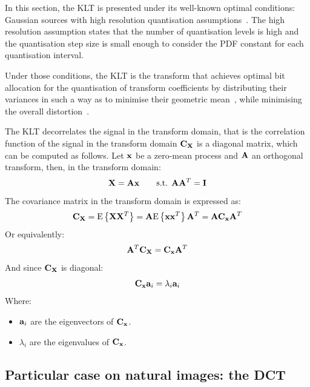 \documentclass[11pt,a4paper,openright,twoside]{book}
\numberwithin{equation}{section} %
\numberwithin{figure}{section} %
\numberwithin{table}{section} %
\begin{document}
In this section, the \ac{KLT} is presented under its well-known optimal
conditions: Gaussian sources with high resolution quantisation
assumptions~\cite{goyal-00-high-resolution}.
The high resolution assumption states that the number of quantisation levels
is high and the quantisation step size is small enough to consider the
\ac{PDF} constant for each quantisation interval.

Under those conditions, the \ac{KLT} is the transform that achieves optimal
bit allocation for the quantisation of transform coefficients by distributing
their variances in such a way as to minimise their geometric
mean~\cite{jayant-84-digital-coding-waveforms}, while minimising the overall
distortion~\cite{gersho-92-vector-quantization}.

The \ac{KLT} decorrelates the signal in the transform domain, that is the
correlation function of the signal in the transform domain $\mathbf{C}_{\mathbf{X}}$ is a
diagonal matrix, which can be computed as follows.
Let $\mathbf{x}$ be a zero-mean process and $\mathbf{A}$ an orthogonal transform, then, in
the transform domain:
\begin{equation}
	\mathbf{X} = \mathbf{A} \mathbf{x} \qquad \text{s.t. } \mathbf{A} \mathbf{A}^T = \mathbf{I}
\end{equation}
The covariance matrix in the transform domain is expressed as:
\begin{equation}
	\mathbf{C}_{\mathbf{X}} = \text{E}\left\{\mathbf{X} \mathbf{X}^T\right\} = \mathbf{A} \text{E}\left\{\mathbf{x}\mathbf{x}^T\right\}\mathbf{A}^T =
	\mathbf{A}\mathbf{C}_{\mathbf{x}}\mathbf{A}^T
\end{equation}
Or equivalently:
\begin{equation}
	\mathbf{A}^T\mathbf{C}_{\mathbf{X}} = \mathbf{C}_{\mathbf{x}}\mathbf{A}^T
\end{equation}
And since $\mathbf{C}_{\mathbf{X}}$ is diagonal:
\begin{equation}
	\mathbf{C}_{\mathbf{x}} \mathbf{a}_i = \lambda_i\mathbf{a}_i
\end{equation}
Where:
\begin{itemize}
	\item $\mathbf{a}_i$ are the eigenvectors of $\mathbf{C}_{\mathbf{x}}$.
	\item $\lambda_i$ are the eigenvalues of $\mathbf{C}_{\mathbf{x}}$.
\end{itemize}

\subsection{Particular case on natural images: the \acs{DCT}}
\label{sub:particular_case_dct}
\end{document}
